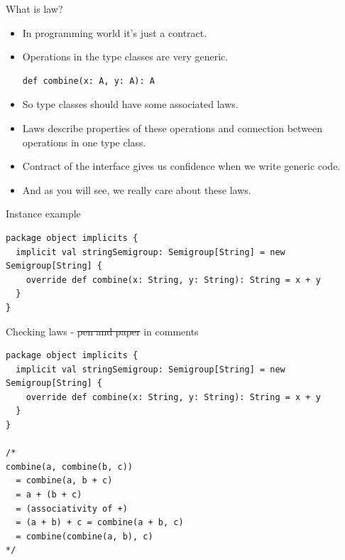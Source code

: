 \documentclass[presentation,aspectratio=169,smaller]{beamer}
\begin{document}
\begin{frame}[label={sec:org35b8dc3},fragile]{What is law?}
 \begin{itemize}
\item In programming world it's just a contract.
\end{itemize}

\pause
\begin{itemize}
\item Operations in the type classes are very generic.
\begin{verbatim}
def combine(x: A, y: A): A
\end{verbatim}
\end{itemize}

\pause
\begin{itemize}
\item So type classes should have some associated laws.
\end{itemize}

\pause
\begin{itemize}
\item Laws describe properties of these operations and connection between operations
in one type class.
\end{itemize}

\pause
\begin{itemize}
\item Contract of the interface gives us confidence when we write generic code.
\end{itemize}

\pause
\begin{itemize}
\item And as you will see, we really care about these laws.
\end{itemize}
\end{frame}

\begin{frame}[label={sec:org5c58d90},fragile]{Instance example}
 \begin{verbatim}
package object implicits {
  implicit val stringSemigroup: Semigroup[String] = new Semigroup[String] {
    override def combine(x: String, y: String): String = x + y
  }
}
\end{verbatim}
\end{frame}

\begin{frame}[label={sec:org58439d6},fragile]{Checking laws - \sout{pen and paper} in comments}
 \begin{verbatim}
package object implicits {
  implicit val stringSemigroup: Semigroup[String] = new Semigroup[String] {
    override def combine(x: String, y: String): String = x + y
  }
}

/*
combine(a, combine(b, c))
  = combine(a, b + c)
  = a + (b + c)
  = (associativity of +)
  = (a + b) + c = combine(a + b, c)
  = combine(combine(a, b), c)
*/
\end{verbatim}
\end{frame}
\end{document}
